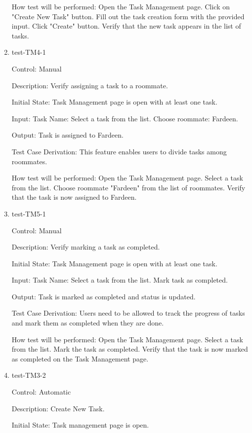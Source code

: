 \documentclass[12pt, titlepage]{article}
\begin{document}
\begin{enumerate}
How test will be performed: 
Open the Task Management page.
Click on "Create New Task" button.
Fill out the task creation form with the provided input.
Click "Create" button.
Verify that the new task appears in the list of tasks.

\item{test-TM4-1\\}

Control: Manual

Description: Verify assigning a task to a roommate.
					
Initial State: Task Management page is open with at least one task.
					
Input: Task Name: Select a task from the list.
Choose roommate: Fardeen.
					
Output: Task is assigned to Fardeen.

Test Case Derivation: This feature enables users to divide tasks among roommates.

How test will be performed: 
Open the Task Management page.
Select a task from the list.
Choose roommate "Fardeen" from the list of roommates.
Verify that the task is now assigned to Fardeen.

\item{test-TM5-1\\}

Control: Manual

Description: Verify marking a task as completed.
					
Initial State: Task Management page is open with at least one task.
					
Input: Task Name: Select a task from the list.
Mark task as completed.
					
Output: Task is marked as completed and status is updated.

Test Case Derivation: Users need to be allowed to track the progress of tasks and mark them as completed when they are done.

How test will be performed: 
Open the Task Management page.
Select a task from the list.
Mark the task as completed.
Verify that the task is now marked as completed on the Task Management page.

\item{test-TM3-2\\}

Control: Automatic

Description: Create New Task.
					
Initial State: Task management page is open.
					

\end{enumerate}
\end{document}
